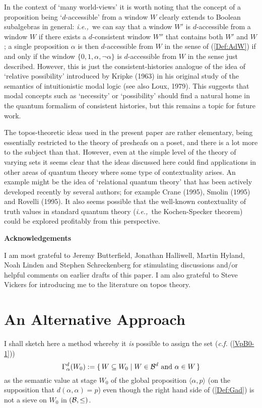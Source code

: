 \documentclass[12pt]{article}
\let\ssection=\section
\renewcommand{\section}{\setcounter{equation}{0}\ssection}
\newcounter{def-number}[section]
\newcommand{\beq}{\begin{equation}}
\newcommand{\eeq}{\end{equation}}
\newcommand{\aand}{\mbox{ and }}
\newcommand{\eq}[1]{(\ref{#1})}
\newcommand{\ie}{{\em i.e.,\ }}
\renewcommand{\a}{\alpha}                   %
\newcommand{\gp}[2]{\langle#1,#2\rangle}
\newcommand{\B}{{\cal B}}
\newcommand{\Bd}{{\cal B}^d}
\newcommand{\G}{\Gamma}
\begin{document}
	In the context of `many world-views' it is worth noting that
the concept of a proposition being `$d$-accessible' from a window
$W$ clearly extends to Boolean subalgebras in general: \ie we can
say that a window $W'$ is $d$-accessible from a window $W$ if there
exists a $d$-consistent window $W''$ that contains both $W'$ and
$W$; a single proposition $\a$ is then $d$-accessible from $W$ in
the sense of \eq{Def:AdW} if and only if the window
$\{0,1,\a,\neg\a\}$ is $d$-accessible from $W$ in the sense just
described.  However, this is just the consistent-histories analogue
of the idea of `relative possibility' introduced by Kripke (1963) in
his original study of the semantics of intuitionistic modal logic
(see also Loux, 1979).  This suggests that modal concepts such as
`necessity' or `possibility' should find a natural home in the
quantum formalism of consistent histories, but this remains a topic
for future work.

	The topos-theoretic ideas used in the present paper are rather
elementary, being essentially restricted to the theory of presheafs
on a poset, and there is a lot more to the subject than that.
However, even at the simple level of the theory of varying sets it
seems clear that the ideas discussed here could find applications in
other areas of quantum theory where some type of contextuality
arises. An example might be the idea of `relational quantum theory'
that has been actively developed recently by several authors; for
example Crane (1995), Smolin (1995) and Rovelli (1995). It also
seems possible that the well-known contextuality of truth values in
standard quantum theory (\ie the Kochen-Specker theorem) could be
explored profitably from this perspective.


\bigskip
\noindent
{\bf Acknowledgements}

\noindent
I am most grateful to Jeremy Butterfield, Jonathan Halliwell, Martin
Hyland, Noah Linden and Stephen Schreckenberg for stimulating
discussions and/or helpful comments on earlier drafts of this paper. I
am also grateful to Steve Vickers for introducing me to the
literature on topos theory.

\bigskip
\appendix
\section{An Alternative Approach}
I shall sketch here a method whereby it {\em is\/} possible to
assign the set ({\em c.f.} \eq{VpB0-1}) 
\beq
	\G_\a^d(W_0):=\{\,W\subseteq W_0\mid W\in\Bd \aand \a\in W\,\}
											\label{Def:Gad}
\eeq
as the semantic value at stage $W_0$ of the global proposition
$\gp{\a}{p}$ (on the supposition that $d(\a,\a)=p$) even though the
right hand side of \eq{Def:Gad} is not a sieve on $W_0$ in
$(\B,\leq)$.
\end{document}
